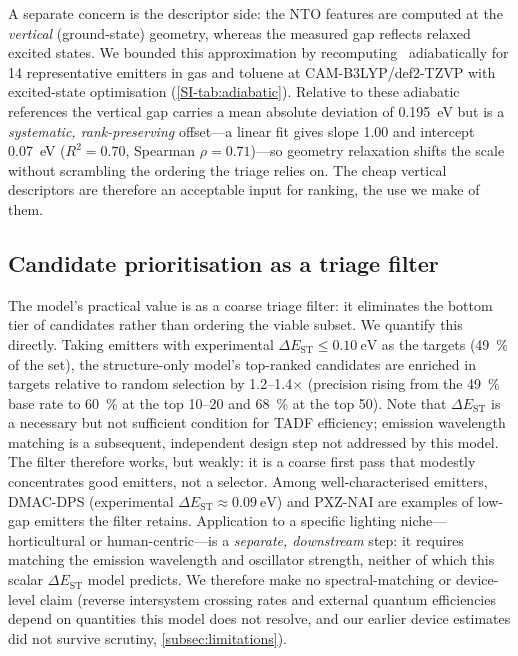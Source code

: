 A separate concern is the descriptor side: the NTO features are computed at the
\emph{vertical} (ground-state) geometry, whereas the measured gap reflects relaxed
excited states. We bounded this approximation by recomputing \deltaest\ adiabatically
for \num{14} representative emitters in gas and toluene at CAM-B3LYP/def2-TZVP with
excited-state optimisation (\cref{SI-tab:adiabatic}). Relative to these adiabatic
references the vertical gap carries a mean absolute deviation of
\qty{0.195}{\electronvolt} but is a \emph{systematic, rank-preserving} offset---a
linear fit gives slope \num{1.00} and intercept \qty{0.07}{\electronvolt}
($R^2 = 0.70$, Spearman $\rho = 0.71$)---so geometry relaxation shifts the scale
without scrambling the ordering the triage relies on. The cheap vertical descriptors
are therefore an acceptable input for ranking, the use we make of them.

\subsection{Candidate prioritisation as a triage filter}\label{subsec:candidates}

The model's practical value is as a coarse triage filter: it eliminates the bottom
tier of candidates rather than ordering the viable subset. We quantify this directly. Taking emitters with experimental
$\Delta E_\text{ST}\le\qty{0.10}{\electronvolt}$ as the targets (\qty{49}{\percent}
of the set), the structure-only model's top-ranked candidates are enriched in
targets relative to random selection by \numrange{1.2}{1.4}$\times$
(precision rising from the \qty{49}{\percent} base rate to \qty{60}{\percent} at
the top \num{10}--\num{20} and \qty{68}{\percent} at the top \num{50}).
Note that $\Delta E_\text{ST}$ is a necessary but not sufficient condition for TADF
efficiency; emission wavelength matching is a subsequent, independent design step
not addressed by this model.
The filter therefore works, but weakly: it is a coarse
first pass that modestly concentrates good emitters, not a selector.
Among well-characterised emitters, DMAC-DPS
(experimental $\Delta E_\text{ST}\approx\qty{0.09}{\electronvolt}$) and PXZ-NAI are
examples of low-gap emitters the filter retains.
Application to a specific lighting niche---horticultural or human-centric---is a
\emph{separate, downstream} step: it requires matching the emission wavelength and
oscillator strength, neither of which this scalar $\Delta E_\text{ST}$ model predicts.
We therefore make no spectral-matching or device-level claim (reverse intersystem
crossing rates and external quantum efficiencies depend on quantities this model does
not resolve, and our earlier device estimates did not survive scrutiny,
\cref{subsec:limitations}).

